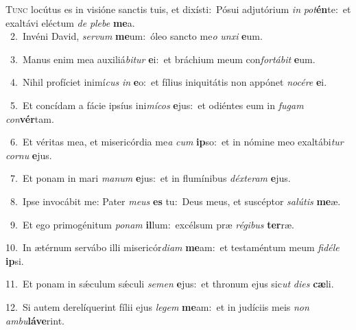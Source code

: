 \lettrine{\initial\textcolor{\initialcolor}{T}}{unc} locútus es in visióne sanctis tuis, et dixísti:~\dagger Pósui adjutórium \textit{in} \textit{pot}\-\textbf{én}te:~\star et exaltávi eléctum \textit{de} \textit{ple}\-\textit{be} \textbf{me}\-a.\\
{\numbfont\textcolor{\numbcolor}{~2.}}~Invéni David, \textit{ser}\-\textit{vum} \textbf{me}\-um:~\star óleo sancto me\textit{o} \textit{un}\-\textit{xi} \textbf{e}\-um.\par
{\numbfont\textcolor{\numbcolor}{~3.}}~Manus enim mea auxiliá\-\textit{bi}\-\textit{tur} \textbf{e}\-i:~\star et bráchium meum con\-\textit{for}\-\textit{tá}\textit{bit} \textbf{e}\-um.\par
{\numbfont\textcolor{\numbcolor}{~4.}}~Nihil profíciet inimí\textit{cus} \textit{in} \textbf{e}\-o:~\star et fílius iniquitátis non appónet \textit{no}\-\textit{cé}\textit{re} \textbf{e}\-i.\par
{\numbfont\textcolor{\numbcolor}{~5.}}~Et concídam a fácie ipsíus ini\-\textit{mí}\-\textit{cos} \textbf{e}\-jus:~\star et odiéntes eum in \textit{fu}\-\textit{gam} \textit{con}\-\textbf{vér}tam.\par
{\numbfont\textcolor{\numbcolor}{~6.}}~Et véritas mea, et misericórdia me\textit{a} \textit{cum} \textbf{ip}\-so:~\star et in nómine meo exaltábi\textit{tur} \textit{cor}\-\textit{nu} \textbf{e}\-jus.\par
{\numbfont\textcolor{\numbcolor}{~7.}}~Et ponam in mari \textit{ma}\-\textit{num} \textbf{e}\-jus:~\star et in flumínibus \textit{déx}\-\textit{te}\textit{ram} \textbf{e}\-jus.\par
{\numbfont\textcolor{\numbcolor}{~8.}}~Ipse invocábit me: Pater \textit{me}\-\textit{us} \textbf{es} tu:~\star Deus meus, et suscéptor \textit{sa}\-\textit{lú}\textit{tis} \textbf{me}\-æ.\par
{\numbfont\textcolor{\numbcolor}{~9.}}~Et ego primogénitum \textit{po}\-\textit{nam} \textbf{il}\-lum:~\star excélsum præ \textit{ré}\-\textit{gi}\textit{bus} \textbf{ter}\-ræ.\par
{\numbfont\textcolor{\numbcolor}{10.}}~In ætérnum servábo illi misericór\-\textit{di}\-\textit{am} \textbf{me}\-am:~\star et testaméntum meum \textit{fi}\-\textit{dé}\textit{le} \textbf{ip}\-si.\par
{\numbfont\textcolor{\numbcolor}{11.}}~Et ponam in sǽculum sǽculi \textit{se}\-\textit{men} \textbf{e}\-jus:~\star et thronum ejus sic\textit{ut} \textit{di}\-\textit{es} \textbf{cæ}\-li.\par
{\numbfont\textcolor{\numbcolor}{12.}}~Si autem derelíquerint fílii ejus \textit{le}\-\textit{gem} \textbf{me}\-am:~\star et in judíciis meis \textit{non} \textit{am}\-\textit{bu}\textbf{lá}\textbf{ve}rint.\par

